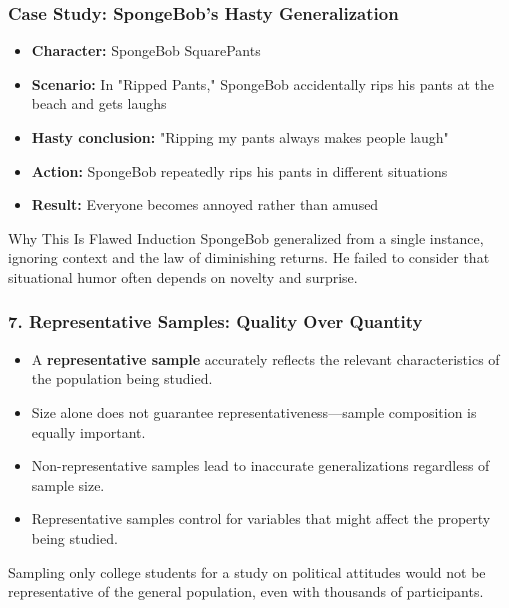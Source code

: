 \documentclass{beamer}
\begin{document}
\begin{frame}
    \frametitle{Case Study: SpongeBob's Hasty Generalization}
    
    \begin{itemize}
    \item \textbf{Character:} SpongeBob SquarePants
    \item \textbf{Scenario:} In "Ripped Pants," SpongeBob accidentally rips his pants at the beach and gets laughs
    \item \textbf{Hasty conclusion:} "Ripping my pants always makes people laugh"
    \item \textbf{Action:} SpongeBob repeatedly rips his pants in different situations
    \item \textbf{Result:} Everyone becomes annoyed rather than amused
    \end{itemize}
    
    \begin{alertblock}{Why This Is Flawed Induction}
    SpongeBob generalized from a single instance, ignoring context and the law of diminishing returns. He failed to consider that situational humor often depends on novelty and surprise.
    \end{alertblock}
    \end{frame}

\begin{frame}
\frametitle{7. Representative Samples: Quality Over Quantity}
\begin{itemize}
\item A \textbf{representative sample} accurately reflects the relevant characteristics of the population being studied.
\item Size alone does not guarantee representativeness—sample composition is equally important.
\item Non-representative samples lead to inaccurate generalizations regardless of sample size.
\item Representative samples control for variables that might affect the property being studied.
\end{itemize}

\begin{example}
Sampling only college students for a study on political attitudes would not be representative of the general population, even with thousands of participants.
\end{example}
\end{frame}
\end{document}
